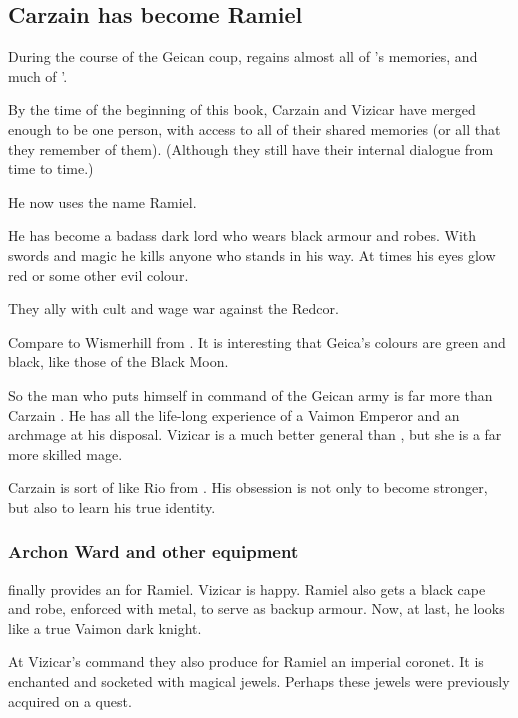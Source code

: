\begin{garbage}
\subsection{Carzain has become Ramiel}
During the course of the Geican coup,  regains almost all of 's memories, and much of '. 

By the time of the beginning of this book, Carzain and Vizicar have merged enough to be one person, with access to all of their shared memories (or all that they remember of them). (Although they still have their internal dialogue from time to time.)

He now uses the name Ramiel. 

He has become a badass dark lord who wears black armour and robes. With swords and magic he kills anyone who stands in his way. At times his eyes glow red or some other evil colour. 

They ally with  cult and wage war against the Redcor. 

Compare to Wismerhill from \FLuneNoire. It is interesting that Geica's colours are green and black, like those of the Black Moon.

So the man who puts himself in command of the Geican army is far more than Carzain \Shireyo. He has all the life-long experience of a Vaimon Emperor and an archmage at his disposal. 
Vizicar is a much better general than \Belzir, but she is a far more skilled mage. 

Carzain is sort of like Rio from \emph{\JuukenSentaiGekiranger}. His obsession is not only to become stronger, but also to learn his true identity. 





\subsubsection{Archon Ward and other equipment}
\Belzir{} finally provides an  for Ramiel. Vizicar is happy. Ramiel also gets a black cape and robe, enforced with metal, to serve as backup armour. Now, at last, he looks like a true Vaimon dark knight. 

At Vizicar's command they also produce for Ramiel an imperial coronet. It is enchanted and socketed with magical jewels. Perhaps these jewels were previously acquired on a quest.








\end{garbage}
